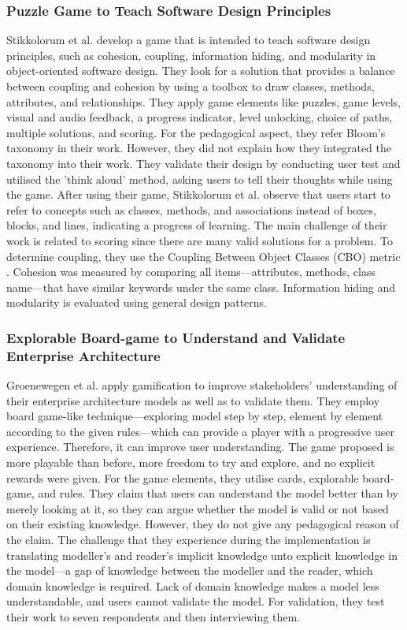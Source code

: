 \documentclass[12pt, a4paper]{report}
\begin{document}
{\subsubsection{Puzzle Game to Teach Software Design Principles}
Stikkolorum et al. \cite{Stikkolorum2014} develop a game that is intended to teach software design principles, such as cohesion, coupling, information hiding, and modularity in object-oriented software design. They look for a solution that provides a balance between coupling and cohesion by using a toolbox to draw classes, methods, attributes, and relationships. They apply game elements like puzzles, game levels, visual and audio feedback, a progress indicator, level unlocking, choice of paths, multiple solutions, and scoring. For the pedagogical aspect, they refer Bloom's taxonomy in their work. However, they did not explain how they integrated the taxonomy into their work. They validate their design by conducting user test and utilised the 'think aloud' method, asking users to tell their thoughts while using the game. After using their game, Stikkolorum et al. \cite{Stikkolorum2014} observe that users start to refer to concepts such as classes, methods, and associations instead of boxes, blocks, and lines, indicating a progress of learning. The main challenge of their work is related to scoring since there are many valid solutions for a problem. To determine coupling, they use the Coupling Between Object Classes (CBO) metric \cite{Stikkolorum2014}. Cohesion was measured by comparing all items---attributes, methods, class name---that have similar keywords under the same class. Information hiding and modularity is evaluated using general design patterns. 


\subsubsection{Explorable Board-game to Understand and Validate Enterprise Architecture}
Groenewegen et al. \cite{Groenewegen2010} apply gamification to improve stakeholders' understanding of their enterprise architecture models as well as to validate them. They employ board game-like technique---exploring model step by step, element by element according to the given rules---which can provide a player with a progressive user experience. Therefore, it can improve user understanding. The game proposed is more playable than before, more freedom to try and explore, and no explicit rewards were given. For the game elements, they utilise cards, explorable board-game, and rules. They claim that users can understand the model better than by merely looking at it, so they can argue whether the model is valid or not based on their existing knowledge. However, they do not give any pedagogical reason of the claim. The challenge that they experience during the implementation is translating modeller's and reader's implicit knowledge unto explicit knowledge in the model---a gap of knowledge between the modeller and the reader, which domain knowledge is required. Lack of domain knowledge makes a model less understandable, and users cannot validate the model. For validation, they test their work to seven respondents and then interviewing them. 

}
\end{document}
